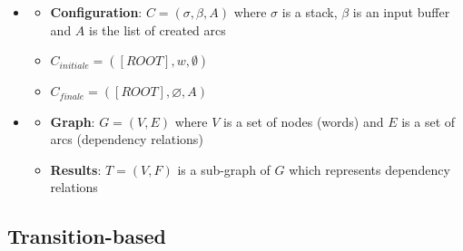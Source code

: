 \documentclass[xcolor=table]{beamer}
\begin{document}
\begin{frame}
	\frametitle{\insertshortsubtitle}
	\framesubtitle{\insertsection}

	\begin{minipage}{.6\textwidth}
	\begin{itemize}
		\item {} 
		\begin{itemize}
			\item \textbf{Configuration}:  $C = (\sigma, \beta, A)$ where $\sigma$ is a stack, $\beta$ is an input buffer and $A$ is the list of created arcs
			\item $C_{initiale} = ([ROOT], w, \emptyset)$
			\item $C_{finale} = ([ROOT], \varnothing, A)$
		\end{itemize}
	\end{itemize}
	\end{minipage}
	\begin{minipage}{.38\textwidth}
	\end{minipage}
	
	\vfill
	
	\begin{minipage}{.6\textwidth}
		\begin{itemize}
			\item {}
			\begin{itemize}
				\item \textbf{Graph}: $G = (V, E)$ where $V$ is a set of nodes (words) and $E$ is a set of arcs (dependency relations)
				\item \textbf{Results}: $T = (V, F)$ is a sub-graph of $G$ which represents dependency relations
			\end{itemize}
		\end{itemize}
	\end{minipage}
	\begin{minipage}{.38\textwidth}
	\end{minipage}

\end{frame}

\subsection{Transition-based}
\end{document}
